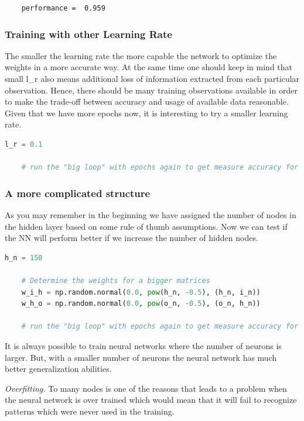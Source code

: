 \begin{lstlisting}
    performance =  0.959
\end{lstlisting}


\subsubsection{Training with other Learning Rate}
   
The smaller the learning rate the more capable the network to optimize the weights in a more accurate way. At the same time one should keep in mind that small l\_r also means additional loss of information extracted from each particular observation. Hence, there should be many training observations available in order to make the trade-off between accuracy and usage of available data reasonable. Given that we have more epochs now, it is interesting to try a smaller learning rate.

\begin{lstlisting}[language=Python]   
    l_r = 0.1

    # run the "big loop" with epochs again to get measure accuracy for new settings.
\end{lstlisting}

\subsubsection{A more complicated structure}

As you may remember in the beginning we have assigned the number of nodes in the hidden layer based on some rule of thumb assumptions. Now we can test if the NN will perform better if we increase the number of hidden nodes.

\begin{lstlisting}[language=Python]   
    h_n = 150
    
    # Determine the weights for a bigger matrices
    w_i_h = np.random.normal(0.0, pow(h_n, -0.5), (h_n, i_n))
    w_h_o = np.random.normal(0.0, pow(o_n, -0.5), (o_n, h_n))
    
    # run the "big loop" with epochs again to get measure accuracy for new settings.
\end{lstlisting}

It is always possible to train neural networks where the number of neurons is larger. But, with a smaller number of neurons the neural network has much better generalization abilities. 

\textit{Overfitting.} To many nodes is one of the reasons that leads to a problem when the neural network is over trained which would mean that it will fail to recognize patterns which were never used in the training.


